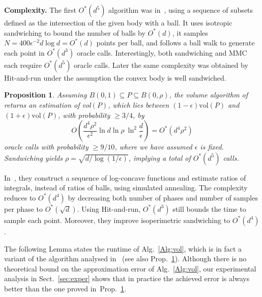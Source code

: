 \documentclass[11pt,a4paper]{article}
\newtheorem{proposition}[theorem]{\noindent Proposition}
\def\vol{\mbox{vol}}
\def\vol{\mbox{vol}}
\begin{document}
\textbf{Complexity.}
The first $O^*(d^5)$ algorithm was in~\cite{KannanLS97}, using
a sequence of subsets defined as the intersection of
the given body with a ball. 
It uses isotropic sandwiching to bound the number of balls by $O^*(d)$,
it samples $N= 400\epsilon^{-2}d\log d=O^*(d)$ points per ball, 
and follows a ball walk to generate each point in $O^*(d^3)$ oracle calls. 
Interestingly, both sandwiching and MMC each require $O^*(d^5)$ oracle calls.
Later the same complexity was obtained by
Hit-and-run under the assumption the convex body is well sandwiched.

\begin{proposition}{\em\cite{KannanLS97}}\label{prop:volume}
Assuming $B(0,1) \subseteq P \subseteq  B(0,\rho)$, the volume algorithm of~\cite{KannanLS97} 
returns an estimation of \vol$(P)$, which lies between 
$(1-\epsilon)\vol(P)$ and $(1+\epsilon)\vol(P)$,
with probability $\ge 3/4$, by 
$$
O\left(\frac{d^4\rho^2}{\epsilon^2}\ln d
	\ln \rho\ \ln^2\frac{d}{\epsilon} \right)=O^*(d^4\rho^2)
$$ 
oracle calls with probability $\ge 9/10$, where we have assumed
$\epsilon$ is fixed.
Sandwiching yields
$\rho=\sqrt{d/\log(1/\epsilon)}$, implying a total of $O^*(d^5)$ calls.
\end{proposition}

In~\cite{LovaszVemp06vol}, they construct 
a sequence of log-concave functions and estimate ratios of integrals, instead of ratios of balls, using simulated annealing.
The complexity reduces to $O^{*}(d^{4})$
by decreasing both number of phases and number of samples per phase to $O^*(\sqrt{d})$. Using Hit-and-run, $O^{*}(d^{3})$ still bounds the time to sample each point.
Moreover, they improve isoperimetric sandwiching to $O^{*}(d^{4})$.
 
The following Lemma states the runtime of Alg.~\ref{Alg:vol}, which is in fact a variant of the algorithm analysed in~\cite{KannanLS97} (see also Prop.~\ref{prop:volume}). Although there is no theoretical bound on the approximation error of Alg.~\ref{Alg:vol}, our experimental analysis in Sect.~\ref{sec:exper} shows that in practice the achieved error is always  better than the one proved in~Prop.~\ref{prop:volume}.
\end{document}
